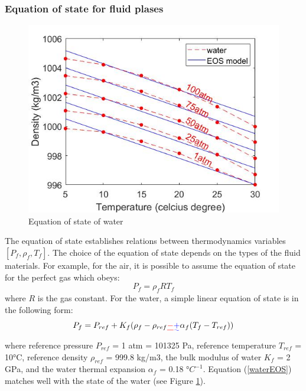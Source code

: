 \documentclass[preprint,12pt]{elsarticle}
\providecommand{\DIFadd}[1]{{\protect\color{blue}\uwave{#1}}} %
\providecommand{\DIFdel}[1]{{\protect\color{red}\sout{#1}}}                      %
\providecommand{\DIFaddbegin}{} %
\providecommand{\DIFaddend}{} %
\providecommand{\DIFdelbegin}{} %
\providecommand{\DIFdelend}{} %
\newcommand{\DIFscaledelfig}{0.5}
\newlength{\DIFdelgraphicswidth} %
\newlength{\DIFdelgraphicsheight} %
\newcommand{\DIFaddincludegraphics}[2][]{{\color{blue}\fbox{\DIFOincludegraphics[#1]{#2}}}} %
\newcommand{\DIFdelincludegraphics}[2][]{%
\sbox{\DIFdelgraphicsbox}{\DIFOincludegraphics[#1]{#2}}%
\settoboxwidth{\DIFdelgraphicswidth}{\DIFdelgraphicsbox} %
\settoboxtotalheight{\DIFdelgraphicsheight}{\DIFdelgraphicsbox} %
\scalebox{\DIFscaledelfig}{%
\parbox[b]{\DIFdelgraphicswidth}{\usebox{\DIFdelgraphicsbox}\\[-\baselineskip] \rule{\DIFdelgraphicswidth}{0em}}\llap{\resizebox{\DIFdelgraphicswidth}{\DIFdelgraphicsheight}{%
\setlength{\unitlength}{\DIFdelgraphicswidth}%
\begin{picture}(1,1)%
\thicklines\linethickness{2pt} %
{\color[rgb]{1,0,0}\put(0,0){\framebox(1,1){}}}%
{\color[rgb]{1,0,0}\put(0,0){\line( 1,1){1}}}%
{\color[rgb]{1,0,0}\put(0,1){\line(1,-1){1}}}%
\end{picture}%
}\hspace*{3pt}}} %
} %
\DeclareRobustCommand{\DIFaddbegin}{\DIFOaddbegin \let\includegraphics\DIFaddincludegraphics} %
\DeclareRobustCommand{\DIFaddend}{\DIFOaddend \let\includegraphics\DIFOincludegraphics} %
\DeclareRobustCommand{\DIFdelbegin}{\DIFOdelbegin \let\includegraphics\DIFdelincludegraphics} %
\DeclareRobustCommand{\DIFdelend}{\DIFOaddend \let\includegraphics\DIFOincludegraphics} %
\begin{document}
\subsubsection{Equation of state for fluid plases}
%
%
\begin{figure}[H]
\center
\includegraphics[scale=.5]{water1.jpg}
\caption{Equation of state of water}
\label{fig:water1}
\end {figure}
%
%
The equation of state establishes relations between thermodynamics variables $[P_f, \rho_f, T_f]$. The choice of the equation of state depends on the types of the fluid materials. For example, for the air, it is possible to assume the equation of state for the perfect gas which obeys:
%
%
\begin{equation}
    P_f = \rho_f R T_f
\end {equation}
%
%
where $R$ is the gas constant. For the water, a simple linear equation of state is in the following form:
%
%
\begin{equation}
    P_f = P_{ref} + K_f (\rho_f - \rho_{ref} \DIFdelbegin \DIFdel{- }\DIFdelend \DIFaddbegin \DIFadd{+ }\DIFaddend \alpha_f(T_f - T_{ref}))
\label{waterEOS}
\end {equation}
%
%
where reference pressure $P_{ref}$ = 1 atm = 101325 Pa, reference temperature $T_{ref}$ = 10°C, reference density  $\rho_{ref}$ = 999.8 kg/m3, the bulk modulus of water $K_f$ = 2 GPa, and the water thermal expansion $\alpha_f$ = 0.18 °$C^{-1}$. Equation (\ref{waterEOS}) matches well with the state of the water (see Figure \ref{fig:water1}).

\end{document}
